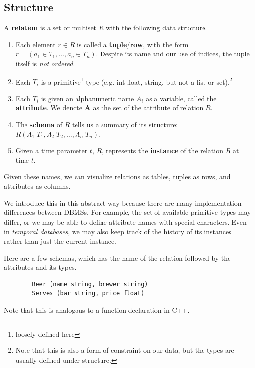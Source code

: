\documentclass{article}
\begin{document}
  \subsection{Structure}

    \begin{definition}[Relation]
      A \textbf{relation} is a set or multiset $R$ with the following data structure. 
      \begin{enumerate}
        \item Each element $r \in R$ is called a \textbf{tuple}/\textbf{row}, with the form $r = (a_1 \in T_1, \ldots, a_n \in T_n)$. Despite its name and our use of indices, the tuple itself is \textit{not ordered}. 
        \item Each $T_i$ is a primitive\footnote{loosely defined here} type (e.g. int float, string, but not a list or set).\footnote{Note that this is also a form of constraint on our data, but the types are usually defined under structure.}
        \item Each $T_i$ is given an alphanumeric name $A_i$ as a variable, called the \textbf{attribute}. We denote $\mathbf{A}$ as the set of the attribute of relation $R$. 
        \item The \textbf{schema} of $R$ tells us a summary of its structure: $R(A_1 \; T_1, A_2 \; T_2, \ldots, A_n \; T_n)$. 
        \item Given a time parameter $t$, $R_t$ represents the \textbf{instance} of the relation $R$ at time $t$. 
      \end{enumerate}
      Given these names, we can visualize relations as tables, tuples as rows, and attributes as columns. 
    \end{definition} 

    We introduce this in this abstract way because there are many implementation differences between DBMSs. For example, the set of available primitive types may differ, or we may be able to define attribute names with special characters. Even in \textit{temporal databases}, we may also keep track of the history of its instances rather than just the current instance. 

    \begin{example}[Schemas]
      Here are a few schemas, which has the name of the relation followed by the attributes and its types. 
      \begin{lstlisting}
        Beer (name string, brewer string)
        Serves (bar string, price float)
      \end{lstlisting}
      Note that this is analogous to a function declaration in C++. 
    \end{example}  
\end{document}
